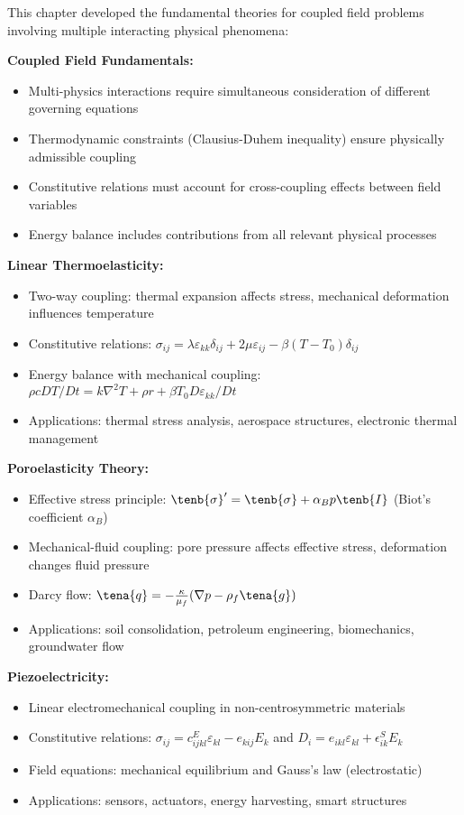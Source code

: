 \begin{subox}[Summary]
This chapter developed the fundamental theories for coupled field problems involving multiple interacting physical phenomena:

\textbf{Coupled Field Fundamentals:}
\begin{itemize}
\item Multi-physics interactions require simultaneous consideration of different governing equations
\item Thermodynamic constraints (Clausius-Duhem inequality) ensure physically admissible coupling
\item Constitutive relations must account for cross-coupling effects between field variables
\item Energy balance includes contributions from all relevant physical processes
\end{itemize}

\textbf{Linear Thermoelasticity:}
\begin{itemize}
\item Two-way coupling: thermal expansion affects stress, mechanical deformation influences temperature
\item Constitutive relations: $\sigma_{ij} = \lambda \varepsilon_{kk} \delta_{ij} + 2\mu \varepsilon_{ij} - \beta (T - T_0) \delta_{ij}$
\item Energy balance with mechanical coupling: $\rho c DT/Dt = k \nabla^2 T + \rho r + \beta T_0 D\varepsilon_{kk}/Dt$
\item Applications: thermal stress analysis, aerospace structures, electronic thermal management
\end{itemize}

\textbf{Poroelasticity Theory:}
\begin{itemize}
\item Effective stress principle: $\tenb{\sigma}' = \tenb{\sigma} + \alpha_B p \tenb{I}$ (Biot's coefficient $\alpha_B$)
\item Mechanical-fluid coupling: pore pressure affects effective stress, deformation changes fluid pressure
\item Darcy flow: $\tena{q} = -\frac{\kappa}{\mu_f}(\nabla p - \rho_f \tena{g})$
\item Applications: soil consolidation, petroleum engineering, biomechanics, groundwater flow
\end{itemize}

\textbf{Piezoelectricity:}
\begin{itemize}
\item Linear electromechanical coupling in non-centrosymmetric materials
\item Constitutive relations: $\sigma_{ij} = c_{ijkl}^E \varepsilon_{kl} - e_{kij} E_k$ and $D_i = e_{ikl} \varepsilon_{kl} + \epsilon_{ik}^S E_k$
\item Field equations: mechanical equilibrium and Gauss's law (electrostatic)
\item Applications: sensors, actuators, energy harvesting, smart structures
\end{itemize}


\end{subox}
